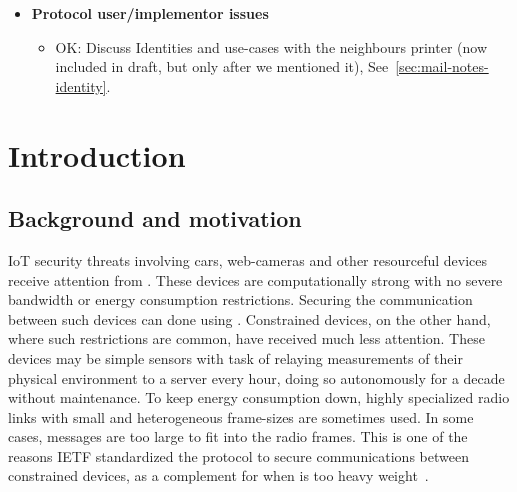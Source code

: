 \documentclass[runningheads,draft,x11names]{llncs}
\begin{document}
{\begin{itemize}
\begin{itemize}
\begin{itemize}
                confirmation and hence explicit inj-agree also for $I$.
                \item Discuss Transcipt hashes that lag behind one message and that
                it is supposed to "cover as much as possible", but sometimes
                does not (check tamarin model also for inconsistencies between
                methods). Unclear design except "as much as possible".
                \end{itemize}
            \item{\textbf{Protocol user/implementor issues}}
                \begin{itemize}
                \item OK: Discuss Identities and use-cases with the neighbours printer
                (now included in draft, but only after we mentioned it),
                See~\ref{sec:mail-notes-identity}.
                \end{itemize}
        \end{itemize}
\end{itemize}
}

\section{Introduction}
\label{sec:introduction}
\subsection{Background and motivation}
\label{sec:motivation}
IoT security threats involving cars, web-cameras and other resourceful devices
receive  attention from .
%
These devices are computationally strong with no severe bandwidth or energy
consumption restrictions.
%
Securing the communication between such devices can  done using
\mDandTls.
%
Constrained devices, on the other hand, where such restrictions  are common,
have received much less attention.
%
These devices may be simple sensors with  task of relaying
measurements of their physical environment to a server every hour,  doing so
autonomously for a decade without maintenance.
%
%
To keep energy consumption down, highly specialized radio links with small
and heterogeneous frame-sizes are sometimes used.
%
In some cases, \mDandTls{} messages are too large to fit into the radio frames.
%
This is one of the reasons IETF standardized the \mOscore{} protocol to secure
communications between constrained devices, as a complement for when
\mDandTls{} is too heavy weight~\cite{rfc8613}.
%
\end{document}
